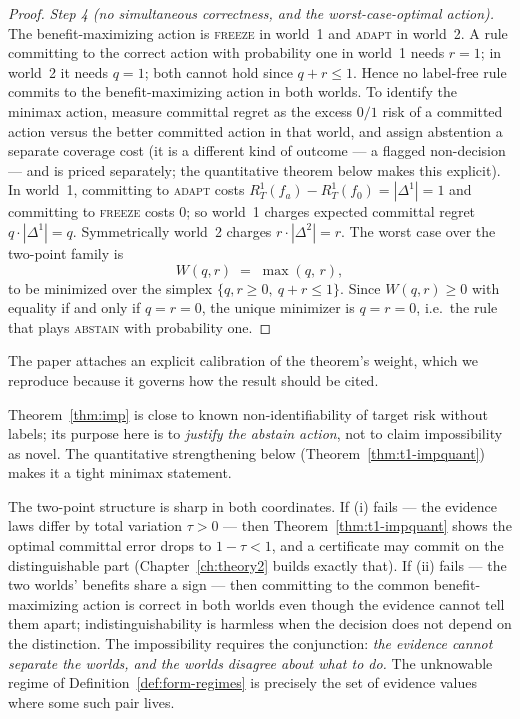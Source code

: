 \begin{proof}
\emph{Step 4 (no simultaneous correctness, and the worst-case-optimal
action).}
The benefit-maximizing action is \textsc{freeze} in world~1 and
\textsc{adapt} in world~2. A rule committing to the correct action with
probability one in world~1 needs $r=1$; in world~2 it needs $q=1$; both
cannot hold since $q+r\le1$. Hence no label-free rule commits to the
benefit-maximizing action in both worlds. To identify the minimax action,
measure committal regret as the excess $0/1$ risk of a committed action
versus the better committed action in that world, and assign abstention a
separate coverage cost (it is a different kind of outcome --- a flagged
non-decision --- and is priced separately; the quantitative theorem below
makes this explicit). In world~1, committing to \textsc{adapt} costs
$R_T^1(f_a)-R_T^1(f_0)=|\Delta^1|=1$ and committing to \textsc{freeze}
costs $0$; so world~1 charges expected committal regret
$q\cdot|\Delta^1|=q$. Symmetrically world~2 charges
$r\cdot|\Delta^2|=r$. The worst case over the two-point family is
\[
W(q,r)\;=\;\max(q,\,r),
\]
to be minimized over the simplex $\{q,r\ge0,\ q+r\le1\}$. Since
$W(q,r)\ge0$ with equality if and only if $q=r=0$, the unique minimizer is
$q=r=0$, i.e.\ the rule that plays \textsc{abstain} with probability one.
\end{proof}

The paper attaches an explicit calibration of the theorem's weight, which
we reproduce because it governs how the result should be cited.

\begin{remark}\label{rem:t1-weight}
Theorem~\ref{thm:imp} is close to known non-identifiability of target risk
without labels; its purpose here is to \emph{justify the abstain action},
not to claim impossibility as novel. The quantitative strengthening below
(Theorem~\ref{thm:t1-impquant}) makes it a tight minimax statement.
\end{remark}

\begin{remark}\label{rem:t1-hypotheses}
The two-point structure is sharp in both coordinates. If (i) fails --- the
evidence laws differ by total variation $\tau>0$ --- then
Theorem~\ref{thm:t1-impquant} shows the optimal committal error drops to
$1-\tau<1$, and a certificate may commit on the distinguishable part
(Chapter~\ref{ch:theory2} builds exactly that). If (ii) fails --- the two
worlds' benefits share a sign --- then committing to the common
benefit-maximizing action is correct in both worlds even though the
evidence cannot tell them apart; indistinguishability is harmless when the
decision does not depend on the distinction. The impossibility requires the
conjunction: \emph{the evidence cannot separate the worlds, and the worlds
disagree about what to do.} The unknowable regime of
Definition~\ref{def:form-regimes} is precisely the set of evidence values
where some such pair lives.
\end{remark}

